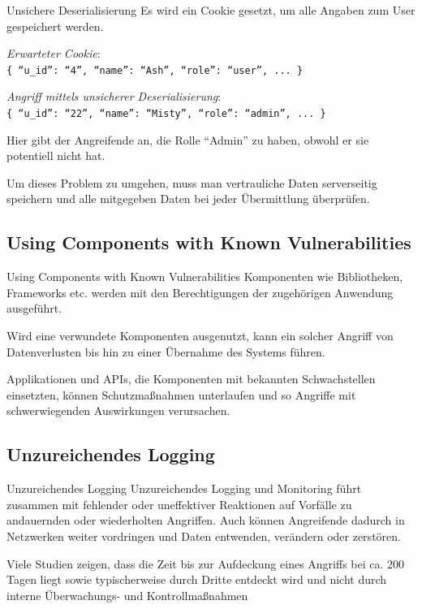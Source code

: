 \begin{example}{Unsichere Deserialisierung}
    Es wird ein Cookie gesetzt, um alle Angaben zum User gespeichert werden.

    \emph{Erwarteter Cookie}: \\
    \texttt{\{ \enquote{u\_id}: \enquote{4}, \enquote{name}: \enquote{Ash}, \enquote{role}: \enquote{user}, ... \}}

    \emph{Angriff mittels unsicherer Deserialisierung}: \\
    \texttt{\{ \enquote{u\_id}: \enquote{22}, \enquote{name}: \enquote{Misty}, \enquote{role}: \enquote{\hl{admin}}, ... \}}

    Hier gibt der Angreifende an, die Rolle \enquote{Admin} zu haben, obwohl er sie potentiell nicht hat.

    Um dieses Problem zu umgehen, muss man vertrauliche Daten serverseitig speichern und alle mitgegeben Daten bei jeder Übermittlung überprüfen.
\end{example}

\subsection{Using Components with Known Vulnerabilities}

\begin{defi}{Using Components with Known Vulnerabilities}
    Komponenten wie Bibliotheken, Frameworks etc. werden mit den Berechtigungen der zugehörigen Anwendung ausgeführt.

    Wird eine verwundete Komponenten ausgenutzt, kann ein solcher Angriff von Datenverlusten bis hin zu einer Übernahme des Systems führen.

    Applikationen und APIs, die Komponenten mit bekannten Schwachstellen einsetzten, können Schutzmaßnahmen unterlaufen und so Angriffe mit schwerwiegenden Auswirkungen verursachen.
\end{defi}

\subsection{Unzureichendes Logging}

\begin{defi}{Unzureichendes Logging}
    Unzureichendes Logging und Monitoring führt zusammen mit fehlender oder uneffektiver Reaktionen auf Vorfälle zu andauernden oder wiederholten Angriffen.
    Auch können Angreifende dadurch in Netzwerken weiter vordringen und Daten entwenden, verändern oder zerstören.

    Viele Studien zeigen, dass die Zeit bis zur Aufdeckung eines Angriffs bei ca. 200 Tagen liegt sowie typischerweise durch Dritte entdeckt wird und nicht durch interne Überwachungs- und Kontrollmaßnahmen
\end{defi}

